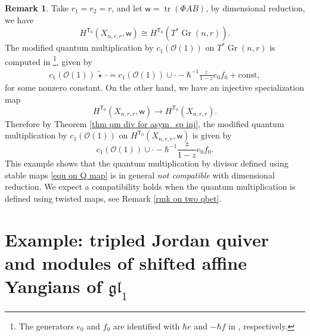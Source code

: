 \documentclass[10pt]{amsart}
\theoremstyle{definition}
\newtheorem{Remark}[Theorem]{Remark}
\numberwithin{equation}{section}
\newcommand{\sT}{\mathsf{T}}
\newcommand{\sw}{\mathsf{w}}
\newcommand{\Gr}{\operatorname{Gr}}
\newcommand{\tr}{\operatorname{tr}}
\begin{document}
\begin{Remark}\label{rm on Q not cp with dim red}
Take $r_1=r_2=r$, and let $\sw=\tr(\Phi AB)$, by dimensional reduction, we have $$H^{\sT_0}(X_{n,r,r},\sw)\cong H^{\sT_0}(T^*\Gr(n,r)). $$
The modified quantum multiplication by $c_1(\mathcal O(1))$ on $T^*\Gr(n,r)$ is computed in \cite[Prop.~11.2.2]{MO}\footnote{The generators $e_0$ and $f_0$ are identified with $\hbar e$ and $-\hbar f$ in \cite[\S 11]{MO}, respectively.}, given by 
\begin{align*}
c_1(\mathcal O(1))\,\widetilde{\star}\,\cdot =
c_1(\mathcal O(1))\cup \cdot -\hbar^{-1}\frac{z}{1-z}e_0f_0+\mathrm{const},
\end{align*}
for some nonzero constant. On the other hand, we have an injective specialization map 
$$H^{\sT_0}(X_{n,r,r},\sw)\to H^{\sT_0}(X_{n,r,r}). $$ Therefore by Theorem \ref{thm qm div for asym_sp inj}, the modified quantum multiplication by $c_1(\mathcal O(1))$ on $H^{\sT_0}(X_{n,r,r},\sw)$ is given by 
$$c_1(\mathcal O(1))\cup \cdot -\hbar^{-1}\frac{z}{1-z}e_0f_0. $$ This example shows that the quantum multiplication by divisor defined using stable maps \eqref{equ on Q map} is in general \textit{not compatible} with dimensional reduction. 
We expect a compatibility holds when the quantum multiplication is defined using twisted maps, see Remark \ref{rmk on two qbet}.
\end{Remark}

\section{Example: tripled Jordan quiver and modules of shifted affine Yangians of \texorpdfstring{$\mathfrak{gl}_1$}{gl(1)}}\label{sect on hilbc3}


\end{document}

